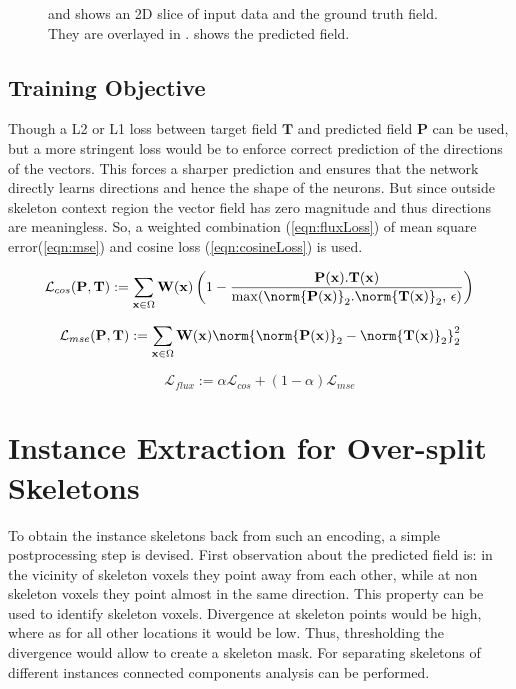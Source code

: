 \begin{figure}[t]
	\caption{ and  shows an 2D slice of input data and the ground truth field. They are overlayed in .  shows the predicted field.}
	\label{fig:learnedField}
\end{figure}

\subsection{Training Objective}
Though a L2 or L1 loss between target field $\mathbf{T}$ and predicted field $\mathbf{P}$ can be used, but a more stringent loss would be to enforce correct prediction of the directions of the vectors. This forces a sharper prediction and ensures that the network directly learns directions and hence the shape of the neurons. But since outside skeleton context region the vector field has zero magnitude and thus directions are meaningless. So, a weighted combination (\autoref{eqn:fluxLoss}) of mean square error(\autoref{eqn:mse}) and cosine loss (\autoref{eqn:cosineLoss}) is used.

\begin{equation}\label{eqn:cosineLoss}
\mathcal{L}_{cos}(\mathbf{P}, \mathbf{T}) := \sum_{\mathbf{x} \in \Omega} \mathbf{W}(\mathbf{x})\left( 1 - \frac{\mathbf{P}(\mathbf{x}).\mathbf{T}(\mathbf{x})}{\max(\norm{\mathbf{P}(\mathbf{x})}_2.\norm{\mathbf{T}(\mathbf{x})}_2,\,\epsilon)} \right)
\end{equation}

\begin{equation} \label{eqn:mse}
\mathcal{L}_{mse}(\mathbf{P}, \mathbf{T}) := \sum_{\mathbf{x} \in \Omega} \mathbf{W}(\mathbf{x}) \norm{ \norm{\mathbf{P}(\mathbf{x})}_{2} - \norm{\mathbf{T}(\mathbf{x})}_{2}}_2^2
\end{equation}

\begin{equation} \label{eqn:fluxLoss}
\mathcal{L}_{flux} := \alpha\mathcal{L}_{cos} + (1-\alpha)\mathcal{L}_{mse}
\end{equation}

\section{Instance Extraction for Over-split Skeletons}
To obtain the instance skeletons back from such an encoding, a simple postprocessing step is devised. First observation about the predicted field is: in the vicinity of skeleton voxels they point away from each other, while at non skeleton voxels they point almost in the same direction. This property can be used to identify skeleton voxels. Divergence at skeleton points would be high, where as for all other locations it would be low. Thus, thresholding the divergence would allow to create a skeleton mask. For separating skeletons of different instances connected components analysis can be performed.

